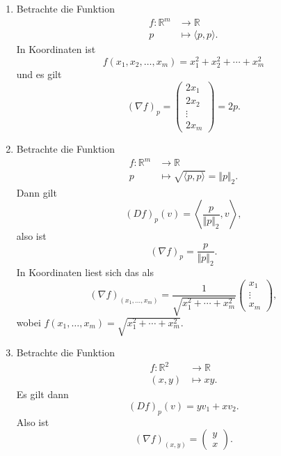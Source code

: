 \documentclass[../main.tex]{subfiles}
\begin{document}
\begin{examples}
  \leavevmode
  \begin{enumerate}[(1)]
    \item Betrachte die Funktion
      \begin{align*}
        f \colon \mathbb{R}^m & \to \mathbb{R} \\
        p & \mapsto \langle p, p \rangle.
      \end{align*}
      In Koordinaten ist
      \[
        f(x_1, x_2, \dots, x_m) = x_1^2 + x_2^2 + \cdots + x_m^2
      \]
      und es gilt
      \[
        {(\nabla f)}_p =
        \begin{pmatrix}
          2x_1 \\
          2x_2 \\
          \vdots \\
          2x_m
        \end{pmatrix}
        = 2p.
      \]
    \item Betrachte die Funktion
      \begin{align*}
        f \colon \mathbb{R}^m & \to \mathbb{R} \\
        p & \mapsto \sqrt{\langle p, p \rangle} = \Vert p \Vert_2.
      \end{align*}
      Dann gilt
      \[
        {(Df)}_p(v) = \left\langle \frac{p}{\Vert p \Vert_2}, v \right\rangle,
      \]
      also ist
      \[
        {(\nabla f)}_p = \frac{p}{\Vert p \Vert_2}.
      \]
      In Koordinaten liest sich das als
      \[
        {(\nabla f)}_{(x_1, \dots, x_m)} 
        = \frac{1}{\sqrt{x_1^2 + \cdots + x_m^2}}
        \begin{pmatrix}
          x_1 \\
          \vdots\\
          x_m
        \end{pmatrix},
      \]
      wobei $f(x_1, \dots, x_m) = \sqrt{x_1^2 + \cdots + x_m^2}$.
    \item Betrachte die Funktion
      \begin{align*}
        f \colon \mathbb{R}^2 & \to \mathbb{R} \\
        (x, y) & \mapsto xy.
      \end{align*}
      Es gilt dann
      \[
        {(Df)}_p(v) = y v_1 + x v_2.
      \]
      Also ist
      \[
        {(\nabla f)}_{(x, y)} =
        \begin{pmatrix}
          y \\ x
        \end{pmatrix}.
      \]
  \end{enumerate}
\end{examples}
\end{document}
